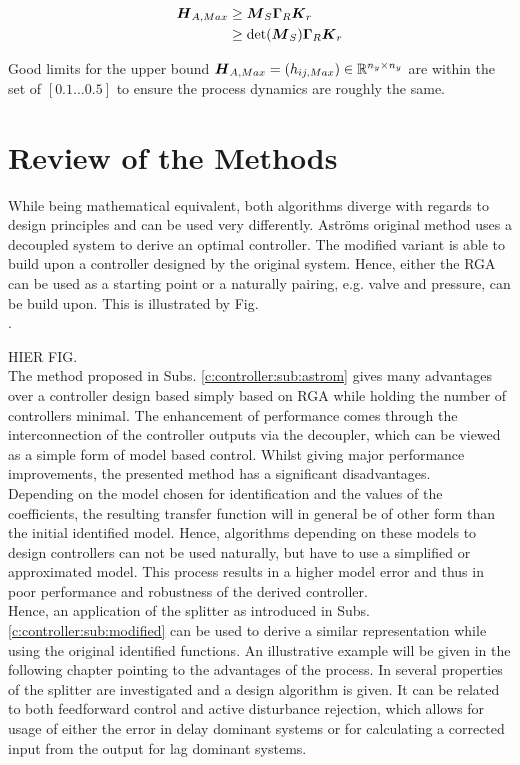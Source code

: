 \begin{align}
\begin{split}
\mbox{\boldmath$H$}_{A,Max} &\geq \mbox{\boldmath$M$}_S \mbox{\boldmath$\Gamma$}_R \mbox{\boldmath$K$}_r \\ 
&\geq \det(\mbox{\boldmath$M$}_S) \mbox{\boldmath$\Gamma$}_R \mbox{\boldmath$K$}_r 
\end{split}
\end{align}

Good limits for the upper bound $\mbox{\boldmath$H$}_{A,Max} = \left( h_{ij,Max}\right) \in \mathbb{R}^{n_y \times n_y}$ are within the set of $\left[0.1 \dots 0.5 \right]$ to ensure the process dynamics are roughly the same.

\section{Review of the Methods}\label{c:controller:s:review}

While being mathematical equivalent, both algorithms diverge with regards to design principles and can be used very differently. Astr\"oms original method uses a decoupled system to derive an optimal controller. The modified variant is able to build upon a controller designed by the original system. Hence, either the RGA can be used as a starting point or a naturally pairing, e.g. valve and pressure, can be build upon. This is illustrated by Fig. \\.

HIER FIG.\\

The method proposed in Subs. \ref{c:controller:sub:astrom} gives many advantages over a controller design based simply based on RGA while holding the number of controllers minimal. The enhancement of performance comes through the interconnection of the controller outputs via the decoupler, which can be viewed as a simple form of model based control. Whilst giving major performance improvements, the presented method has a significant disadvantages.\\

Depending on the model chosen for identification and the values of the coefficients, the resulting transfer function will in general be of other form than the initial identified model. Hence, algorithms depending on these models to design controllers can not be used naturally, but have to use a simplified or approximated model. This process results in a higher model error and thus in poor performance and robustness of the derived controller.\\

Hence, an application of the splitter as introduced in Subs.\ref{c:controller:sub:modified} can be used to derive a similar representation while using the original identified functions. An illustrative example will be given in the following chapter pointing to the advantages of the process. In \cite{Wang2006} several properties of the splitter are investigated and a design algorithm is given. It can be related to both feedforward control and active disturbance rejection, which allows for usage of either the error in delay dominant systems or for calculating a corrected input from the output for lag dominant systems.

